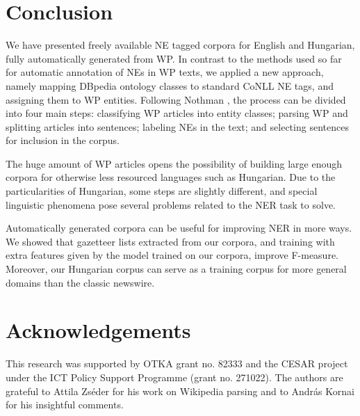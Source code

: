 \documentclass[11pt]{article}
\begin{document}
\section{Conclusion}
\label{sec:conclusion}

We have presented freely available NE tagged corpora for English and
Hungarian, fully automatically generated from WP. In contrast to the methods
used so far for automatic annotation of NEs in WP texts, we applied a new
approach, namely mapping DBpedia ontology classes to standard CoNLL NE tags,
and assigning them to WP entities. 
Following Nothman ,
the process can be divided into four main steps: classifying WP articles into
entity classes; parsing WP and splitting articles into sentences; labeling NEs
in the text; and selecting sentences for inclusion in the corpus.

The huge amount of WP articles opens the possibility of building large enough
corpora for otherwise less resourced languages such as Hungarian. Due to the
particularities of Hungarian, some steps are slightly different, and special
linguistic phenomena pose several problems related to the NER task to solve.

Automatically generated corpora can be useful for improving NER in more
ways. We showed that gazetteer lists extracted from our corpora, and training
with extra features given by the model trained on our corpora, improve
F-measure. Moreover, our Hungarian corpus can serve as a training corpus for
more general domains than the classic newswire.


\section*{Acknowledgements}

This research was supported by OTKA grant no. 82333 and the CESAR project under the ICT Policy Support Programme (grant no. 271022). The authors are grateful to Attila Zséder for his work on Wikipedia parsing and to András Kornai for his insightful comments.
\end{document}
